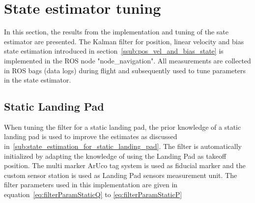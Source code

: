 \section{State estimator tuning} %
\label{sec:state_estimator_tuning}
In this section, the results from the implementation and tuning of the sate estimator are presented. The Kalman filter for position, linear velocity and bias state estimation introduced in section~\ref{ssub:pos_vel_and_bias_state} is implemented in the ROS node "node\_navigation". All measurements are collected in \gls{ROS} bags (data logs) during flight and subsequently used to tune parameters in the state estimator. 

\subsection{Static Landing Pad} %
\label{sub:static_landing_pad}
\begin{minipage}[c]{0.65\textwidth}
	When tuning the filter for a static landing pad, the prior knowledge of a static landing pad is used to improve the estimates as discussed in~\ref{sub:state_estimation_for_static_landing_pad}. The filter is automatically initialized by adapting the knowledge of using the Landing Pad as takeoff position. The multi marker ArUco tag system is used as fiducial marker and the custom sensor station is used as Landing Pad sensors measurement unit. The filter parameters used in this implementation are given in equation~\ref{eq:filterParamStaticQ} to \ref{eq:filterParamStaticP}
\end{minipage}\hfill
